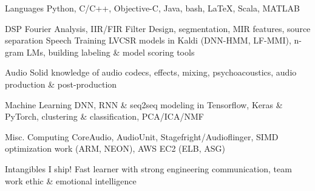 

\begin{cvskills}

  \cvskill
    {Languages} %
    {Python, C/C++, Objective-C, Java, bash, LaTeX, Scala, MATLAB}
    
  \cvskill
    {DSP} %
    {Fourier Analysis, IIR/FIR Filter Design, segmentation, MIR features, source separation} %
  \cvskill
    {Speech} %
    {Training LVCSR models in Kaldi (DNN-HMM, LF-MMI), n-gram LMs, building labeling \& model scoring tools} %
    
  \cvskill
    {Audio} %
    {Solid knowledge of audio codecs, effects, mixing, psychoacoustics, audio production \& post-production } %

  \cvskill
    {Machine Learning} %
    {DNN, RNN \& seq2seq modeling in Tensorflow, Keras \& PyTorch,  clustering \& classification, PCA/ICA/NMF} %

  \cvskill
    {Misc. Computing} %
    {CoreAudio, AudioUnit, Stagefright/Audioflinger, SIMD optimization work (ARM, NEON), AWS EC2 (ELB, ASG)} %
    
  \cvskill
    {Intangibles} %
    {I ship! Fast learner with strong engineering communication, team work ethic \& emotional intelligence} %



\end{cvskills}

